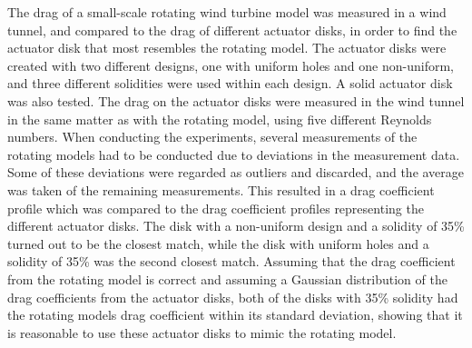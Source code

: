 The drag of a small-scale rotating wind turbine model was measured in a wind tunnel, and compared to the drag of different actuator disks, in order to find the actuator disk that most resembles the rotating model. The actuator disks were created with two different designs, one with uniform holes and one non-uniform, and three different solidities were used within each design. A solid actuator disk was also tested. The drag on the actuator disks were measured in the wind tunnel in the same matter as with the rotating model, using five different Reynolds numbers. When conducting the experiments, several measurements of the rotating models had to be conducted due to deviations in the measurement data. Some of these deviations were regarded as outliers and discarded, and the average was taken of the remaining measurements. This resulted in a drag coefficient profile which was compared to the drag coefficient profiles representing the different actuator disks. The disk with a non-uniform design and a solidity of 35\% turned out to be the closest match, while the disk with uniform holes and a solidity of 35\% was the second closest match. Assuming that the drag coefficient from the rotating model is correct and assuming a Gaussian distribution of the drag coefficients from the actuator disks, both of the disks with 35\% solidity had the rotating models drag coefficient within its standard deviation, showing that it is reasonable to use these actuator disks to mimic the rotating model. 














